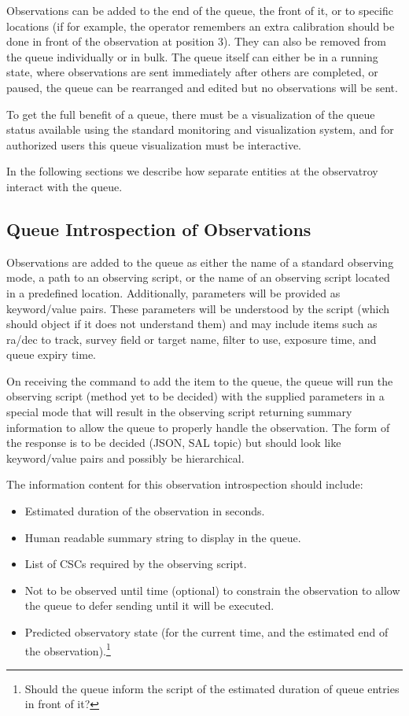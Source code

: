 \documentclass[TS,toc,lsstdraft]{lsstdoc}
\begin{document}
Observations can be added to the end of the queue, the front of it, or to specific locations (if for example, the operator remembers an extra calibration should be done in front of the observation at position 3).
They can also be removed from the queue individually or in bulk.
The queue itself can either be in a running state, where observations are sent immediately after others are completed, or paused, the queue can be rearranged and edited but no observations will be sent.

To get the full benefit of a queue, there must be a visualization of the queue status available using the standard monitoring and visualization system, and for authorized users this queue visualization must be interactive.

In the following sections we describe how separate entities at the observatroy interact with the queue.

\subsection{Queue Introspection of Observations}

Observations are added to the queue as either the name of a standard observing mode, a path to an observing script, or the name of an observing script located in a predefined location.
Additionally, parameters will be provided as keyword/value pairs.
These parameters will be understood by the script (which should object if it does not understand them) and may include items such as ra/dec to track, survey field or target name, filter to use, exposure time, and queue expiry time.

On receiving the command to add the item to the queue, the queue will run the observing script (method yet to be decided) with the supplied parameters in a special mode that will result in the observing script returning summary information to allow the queue to properly handle the observation.
The form of the response is to be decided (JSON, SAL topic) but should look like keyword/value pairs and possibly be hierarchical.

The information content for this observation introspection should include:

\begin{itemize}
  \item Estimated duration of the observation in seconds.
  \item Human readable summary string to display in the queue.
  \item List of CSCs required by the observing script.
  \item Not to be observed until time (optional) to constrain the observation to allow the queue to defer sending until it will be executed.
  \item Predicted observatory state (for the current time, and the estimated end of the observation).\footnote{Should the queue inform the script of the estimated duration of queue entries in front of it?}
\end{itemize}
\end{document}
